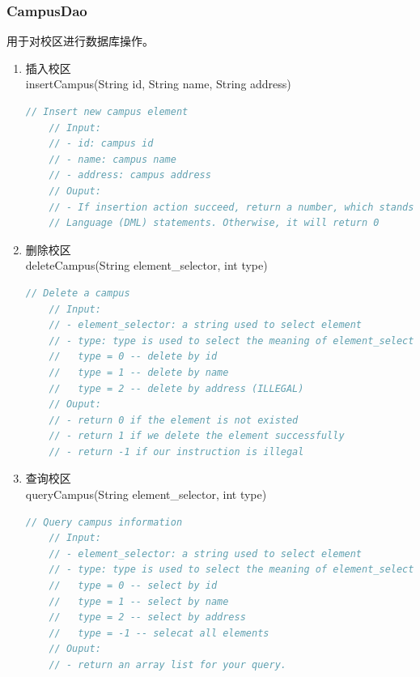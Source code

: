 \documentclass[../report.tex]{subfiles}
\begin{document}
\subsubsection{CampusDao}
用于对校区进行数据库操作。
\begin{enumerate}
\ttfamily 
\item 插入校区\\
insertCampus(String id, String name, String address)
\begin{lstlisting}[language=java, backgroundcolor=\color{lightgray}]
    // Insert new campus element
    // Input:
    // - id: campus id
    // - name: campus name
    // - address: campus address
    // Ouput:
    // - If insertion action succeed, return a number, which stands for the row count for SQL Data Manipulation
    // Language (DML) statements. Otherwise, it will return 0
\end{lstlisting}

\item 删除校区\\
deleteCampus(String element\_selector, int type)
\begin{lstlisting}[language=java, backgroundcolor=\color{lightgray}]
    // Delete a campus
    // Input:
    // - element_selector: a string used to select element
    // - type: type is used to select the meaning of element_selector
    //   type = 0 -- delete by id
    //   type = 1 -- delete by name
    //   type = 2 -- delete by address (ILLEGAL)
    // Ouput:
    // - return 0 if the element is not existed
    // - return 1 if we delete the element successfully
    // - return -1 if our instruction is illegal
\end{lstlisting}

\item 查询校区\\
queryCampus(String element\_selector, int type)
\begin{lstlisting}[language=java, backgroundcolor=\color{lightgray}]
    // Query campus information
    // Input:
    // - element_selector: a string used to select element
    // - type: type is used to select the meaning of element_selector
    //   type = 0 -- select by id
    //   type = 1 -- select by name
    //   type = 2 -- select by address
    //   type = -1 -- selecat all elements
    // Ouput:
    // - return an array list for your query.
\end{lstlisting}


\end{enumerate}
\end{document}
